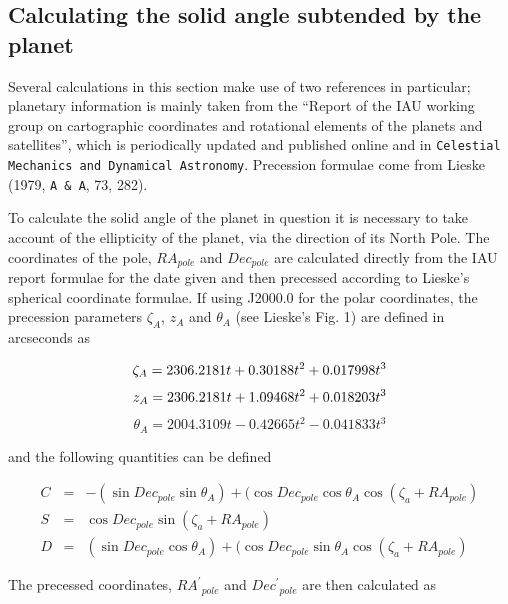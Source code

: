 \documentclass[11pt,twoside]{article}
\newcommand{\xlabel}[1]{}
\renewcommand{\_}{\texttt{\symbol{95}}}
\begin{document}
\subsection{Calculating the solid angle subtended by the planet}
\xlabel{solidangle}
\label{sec:solidangle}

Several calculations in this section make use of two references in particular; planetary information is mainly taken from the ``Report of the IAU working group on cartographic coordinates and rotational elements of the planets and satellites'', which is periodically updated and published online and in {\tt{Celestial Mechanics and Dynamical Astronomy}}.  Precession formulae come from Lieske (1979, {\tt{A \& A}}, 73, 282).

To calculate the solid angle of the planet in question it is necessary to take account of the ellipticity of the planet, via the direction of its North Pole.  The coordinates of the pole, $RA_{pole}$ and $Dec_{pole}$ are calculated directly from the IAU report formulae for the date given and then precessed according to Lieske's spherical coordinate formulae.  If using J2000.0 for the polar coordinates, the precession parameters $\zeta_A$, $z_A$ and $\theta_A$ (see Lieske's Fig. 1) are defined in arcseconds as

\begin{displaymath}
\zeta_A = 2306.2181 t + 0.30188 {t^2} + 0.017998 {t^3}\\
\end{displaymath}
\begin{displaymath}
z_A = 2306.2181 t + 1.09468 {t^2} + 0.018203 {t^3}\\
\end{displaymath}
\begin{displaymath}
\theta_A = 2004.3109 t - 0.42665 {t^2} - 0.041833 {t^3}
\end{displaymath}

and the following quantities can be defined

\begin{eqnarray*}
C & = & -(\sin Dec_{pole} \sin \theta_A) + (\cos Dec_{pole} \cos \theta_A \cos (\zeta_a + RA_{pole})\\
S & = & \cos Dec_{pole} \sin (\zeta_a + RA_{pole})\\
D & = & (\sin Dec_{pole} \cos \theta_A) + (\cos Dec_{pole} \sin \theta_A \cos (\zeta_a + RA_{pole})
\end{eqnarray*}

The precessed coordinates, ${RA^\prime}_{pole}$ and ${Dec^\prime}_{pole}$ are then calculated as
\end{document}
